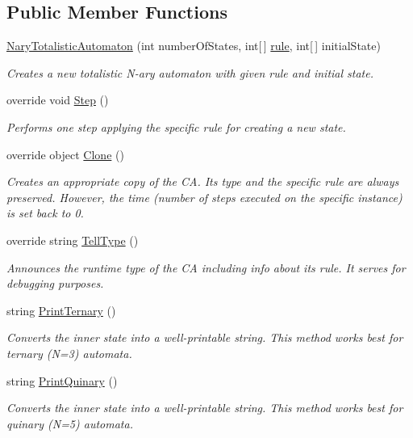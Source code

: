 \subsection*{Public Member Functions}
\begin{DoxyCompactItemize}
\item 
\hyperlink{class_cellular_1_1_nary_totalistic_automaton_aafe92ae99ccbb3591b128d6e720227f6}{Nary\+Totalistic\+Automaton} (int number\+Of\+States, int\mbox{[}$\,$\mbox{]} \hyperlink{class_cellular_1_1_nary_totalistic_automaton_a878c767c6823bd8ed8dc0f7d2ccb1fd2}{rule}, int\mbox{[}$\,$\mbox{]} initial\+State)
\begin{DoxyCompactList}\small\item\em Creates a new totalistic N-\/ary automaton with given rule and initial state. \end{DoxyCompactList}\item 
override void \hyperlink{class_cellular_1_1_nary_totalistic_automaton_ad90769a438ab94b46d4750a571782056}{Step} ()
\begin{DoxyCompactList}\small\item\em Performs one step applying the specific rule for creating a new state. \end{DoxyCompactList}\item 
override object \hyperlink{class_cellular_1_1_nary_totalistic_automaton_a13f16113915ecec451fc4764a32044f9}{Clone} ()
\begin{DoxyCompactList}\small\item\em Creates an appropriate copy of the C\+A. Its type and the specific rule are always preserved. However, the time (number of steps executed on the specific instance) is set back to 0. \end{DoxyCompactList}\item 
override string \hyperlink{class_cellular_1_1_nary_totalistic_automaton_aa691c532a55638c7e3d0c125a4244773}{Tell\+Type} ()
\begin{DoxyCompactList}\small\item\em Announces the runtime type of the C\+A including info about its rule. It serves for debugging purposes. \end{DoxyCompactList}\item 
string \hyperlink{class_cellular_1_1_nary_totalistic_automaton_a239c8e21ae35741c4baadb96be21cec9}{Print\+Ternary} ()
\begin{DoxyCompactList}\small\item\em Converts the inner state into a well-\/printable string. This method works best for ternary (N=3) automata. \end{DoxyCompactList}\item 
string \hyperlink{class_cellular_1_1_nary_totalistic_automaton_aa9d5e154d625d8a8884221df45766145}{Print\+Quinary} ()
\begin{DoxyCompactList}\small\item\em Converts the inner state into a well-\/printable string. This method works best for quinary (N=5) automata. \end{DoxyCompactList}\end{DoxyCompactItemize}
